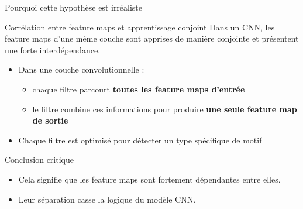 \documentclass[aspectratio=169]{beamer}
\begin{document}
\begin{frame}{Pourquoi cette hypothèse est irréaliste}

\begin{block}{Corrélation entre feature maps et apprentissage conjoint}
Dans un CNN, les feature maps d’une même couche sont apprises de manière
conjointe et présentent une forte interdépendance.
\end{block}

\bigskip

\begin{itemize}
    \item Dans une couche convolutionnelle :
    \begin{itemize}
        \item chaque filtre parcourt \textbf{toutes les feature maps d’entrée}
        \item le filtre combine ces informations pour produire \textbf{une seule feature map de sortie}
    \end{itemize}
        \item Chaque filtre est optimisé pour détecter un type spécifique de motif
\end{itemize}

\begin{alertblock}{Conclusion critique}
\begin{itemize}
    \item Cela signifie que les feature maps sont fortement dépendantes entre elles.
    \item Leur séparation casse la logique du modèle CNN.
\end{itemize}
\end{alertblock}

\end{frame}
\end{document}
